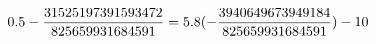 \documentclass[preview]{standalone}
\begin{document}
\begin{align*}
\special{dvisvgm:raw <g id='unique000'>}0.5 - \frac{31525197391593472}{825659931684591} = 5.8 (- \frac{3940649673949184}{825659931684591}) - 10\special{dvisvgm:raw </g>}
\end{align*}
\end{document}
